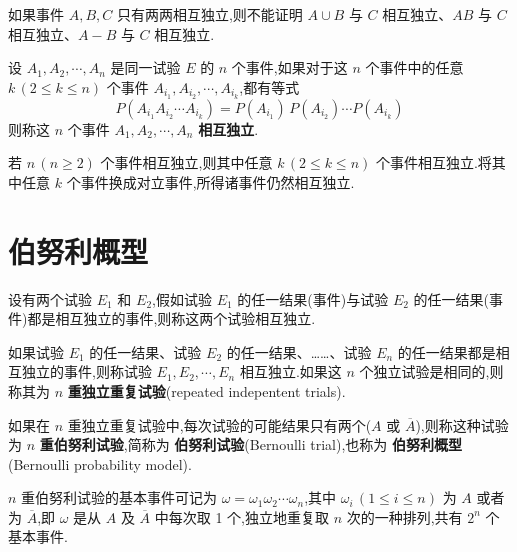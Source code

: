 \begin{note}
    \indent 如果事件 $A,B,C$ 只有两两相互独立,则不能证明 $A \cup B$ 与 $C$ 相互独立、$AB$ 与 $C$ 相互独立、$A-B$ 与 $C$ 相互独立.
\end{note}

\begin{definition}
    \indent 设 $A_1,A_2,\cdots,A_n$ 是同一试验 $E$ 的 $n$ 个事件,如果对于这 $n$ 个事件中的任意 $k\,(2\leqslant k\leqslant n)$ 个事件 $A_{i_1},A_{i_2},\cdots,A_{i_k}$,都有等式
    $$
    P(A_{i_1} A_{i_2} \cdots A_{i_k}) = P(A_{i_1}) \, P(A_{i_2}) \cdots P(A_{i_k})
    $$
    则称这 $n$ 个事件 $A_1,A_2,\cdots,A_n$ \textbf{相互独立}.
\end{definition}

\begin{conclusion}
    \indent 若 $n\, (n \geqslant 2)$ 个事件相互独立,则其中任意 $k\, (2 \leqslant k \leqslant n)$ 个事件相互独立.将其中任意 $k$ 个事件换成对立事件,所得诸事件仍然相互独立.
\end{conclusion}

\section{伯努利概型}

\begin{definition}
    \indent 设有两个试验 $E_1$ 和 $E_2$,假如试验 $E_1$ 的任一结果(事件)与试验 $E_2$ 的任一结果(事件)都是相互独立的事件,则称这两个试验相互独立.
\end{definition}

\begin{definition}
    \indent 如果试验 $E_1$ 的任一结果、试验 $E_2$ 的任一结果、……、试验 $E_n$ 的任一结果都是相互独立的事件,则称试验 $E_1, E_2, \cdots, E_n$ 相互独立.如果这 $n$ 个独立试验是相同的,则称其为 $n$ \textbf{重独立重复试验}(repeated indepentent trials).
\end{definition}

\begin{definition}
    \indent 如果在 $n$ 重独立重复试验中,每次试验的可能结果只有两个($A$ 或 $\overline{A}$),则称这种试验为 $n$ \textbf{重伯努利试验},简称为 \textbf{伯努利试验}(Bernoulli trial),也称为 \textbf{伯努利概型}(Bernoulli probability model).
\end{definition}

$n$ 重伯努利试验的基本事件可记为 $\omega=\omega_1 \omega_2 \cdots \omega_n$,其中 $\omega_i\,(1\leqslant i\leqslant n)$ 为 $A$ 或者为 $\overline{A}$,即 $\omega$ 是从 $A$ 及 $\overline{A}$ 中每次取 1 个,独立地重复取 $n$ 次的一种排列,共有 $2^n$ 个基本事件.

